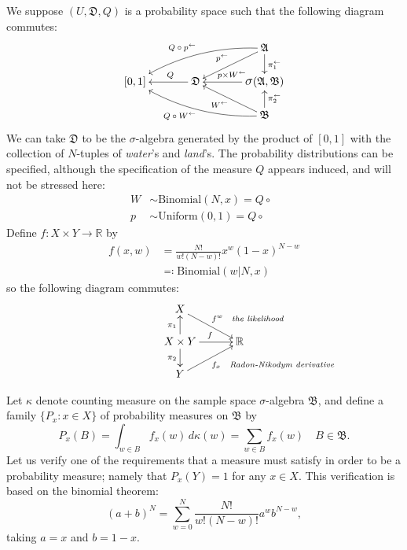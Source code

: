 \documentclass[
twoside=true,
paper=letter,
fontsize=9pt,
pagesize=auto,
leqno,
openany,
headsepline,
overfullrule,
]{scrbook}
\theoremstyle{plain}
\theoremstyle{plain}
\theoremstyle{definition}
\theoremstyle{bfnoteitalic}
\theoremstyle{bfnoteroman}
\newcommand{\sigalg}[1]{\mathfrak{#1}}
\newcommand{\defines}{\eqqcolon}
\newcommand{\sagb}{\mathop{\hbox{\large{$\sigma$}}}\nolimits}
\newcommand{\textsigma}{\hbox{\large{$\sigma$}}\kern-1pt}
\newcommand{\preimage}[1]{\mathop{#1^{\leftarrow}}}
\newcommand{\R}{\mathbb{R}}
\newcommand{\productsig}[2]{\sagb(#1,#2)}
\newcommand{\function}{f}
\newcommand{\measurespace}{X}
\newcommand{\measurespaceii}{Y}
\newcommand{\setii}{B}
\newcommand{\projectionone}{\pi_1}
\newcommand{\projectiontwo}{\pi_2}
\newcommand{\pspace}{\measurespace}%
\newcommand{\sspace}{\measurespaceii}%
\newcommand{\pspaceelt}{x}
\newcommand{\sspacesig}{\sigalg{B}}
\newcommand{\pspacesig}{\sigalg{A}}
\begin{document}
We suppose $(U,\sigalg{D},Q)$ is a probability space such that the following diagram commutes:
\[
\xymatrix@R=16pt@C=35pt{
 & & \pspacesig
 \ar@/_10pt/[dll]_{\makebox[0pt][r] {\scriptsize{$Q\circ\preimage{p}$}} }
 \ar[dl]_{\makebox[0pt][r]{\scriptsize{$\preimage{p}$}}}
 \ar[d]^{\preimage{\projectionone}}
 \\
 [0,1] & \sigalg{D} \ar[l]_-{\ Q} &
 \productsig{\pspacesig}{\sspacesig}
 \ar[l]_{\ \preimage{p\times W}}
 \\
 & & \sspacesig
  \ar[u]_{\preimage{\projectiontwo}}
  \ar[ul]^{\makebox[0pt][r]{\scriptsize{$\preimage{W}$}}}
  \ar@/^10pt/[ull]^{\makebox[0pt][r] {\scriptsize{$Q\circ\preimage{W}$}} }
  \\
}
\]
We can take $\sigalg{D}$ to be the \textsigma-algebra generated by
the product of $[0,1]$ with the collection of $N$-tuples of \textit{water}'s and \textit{land}'s.
The probability distributions can be specified, although the specification of the measure $Q$ appears induced, and will not be stressed here:
\begin{align*}
W & \sim \text{Binomial}(N, \pspaceelt) = Q\circ \preimage{W}\\
p & \sim \text{Uniform}(0, 1) = Q\circ \preimage{p}
\end{align*}
Define $\function:\pspace \times \sspace \to\R$ by
\begin{align*}
\function(\pspaceelt,w)
& =
\frac{N!}
{w!(N-w)!}
\pspaceelt^w(1-\pspaceelt)^{N-w} \\
& \defines
\text{Binomial}(w\vert N,\pspaceelt)
\end{align*}
so the following diagram commutes:
\[
\xymatrix@R=16pt@C=30pt{ 
\pspace
\ar[dr]^{\makebox[0pt][l]{\scriptsize{$\function^w$\quad\emph{the likelihood}}}}
& \\
\pspace\times\sspace 
\ar[u]^{\projectionone}
\ar[d]_{\projectiontwo}
\ar[r]^{\function}
& \R \\
\sspace 
\ar[ur]_{\makebox[0pt][l]{\scriptsize{$\function_x$\quad\emph{Radon-Nikodym derivative}}}}
& 
}
\]

Let $\kappa$ denote counting measure on the sample space \textsigma-algebra $\sspacesig$,
and define a family $\{P_\pspaceelt :\pspaceelt\in \pspace \}$ of probability measures on
$\sspacesig$ by
\[
P_\pspaceelt{(\setii)} =
\int_{w\in\setii}\function_\pspaceelt(w)\,d\kappa(w) =
\sum_{w\in\setii}\function_\pspaceelt(w)
\quad \setii\in\sspacesig.
\]
Let us verify one of the requirements that a measure must satisfy in order to be a probability measure; namely that
$P_\pspaceelt(\sspace)=1$ for any $\pspaceelt\in\pspace$. This verification is based on the binomial theorem:
\[
(a+b)^N=\sum_{w=0}^N
\frac{N!}
{w!(N-w)!}
a^w b^{N-w},
\]
taking $a=\pspaceelt$ and $b=1-\pspaceelt$.
\end{document}

